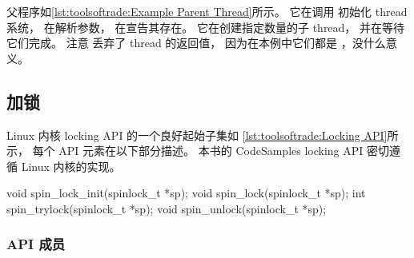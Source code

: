 \begin{listing}

\caption{子 Thread 示例}
\label{lst:toolsoftrade:Example Child Thread}
\end{listing}

\begin{fcvref}
父程序如\cref{lst:toolsoftrade:Example Parent Thread}所示。
它在调用  初始化 thread 系统，
在解析参数，
在宣告其存在。
它在创建指定数量的子 thread，
并在等待它们完成。
注意  丢弃了 thread 的返回值，
因为在本例中它们都是 ，没什么意义。
\end{fcvref}

\begin{listing}

\caption{父 Thread 示例}
\label{lst:toolsoftrade:Example Parent Thread}
\end{listing}

\QuickQuizEnd

\subsection{加锁}
\label{sec:toolsoftrade:Locking}

Linux 内核 locking API 的一个良好起始子集如
\cref{lst:toolsoftrade:Locking API}所示，
每个 API 元素在以下部分描述。
本书的 CodeSamples locking API 密切遵循 Linux 内核的实现。

\begin{listing}
\begin{VerbatimL}[numbers=none]
void spin_lock_init(spinlock_t *sp);
void spin_lock(spinlock_t *sp);
int spin_trylock(spinlock_t *sp);
void spin_unlock(spinlock_t *sp);
\end{VerbatimL}
\caption{锁 API 接口}
\label{lst:toolsoftrade:Locking API}
\end{listing}

\subsubsection{API 成员}

